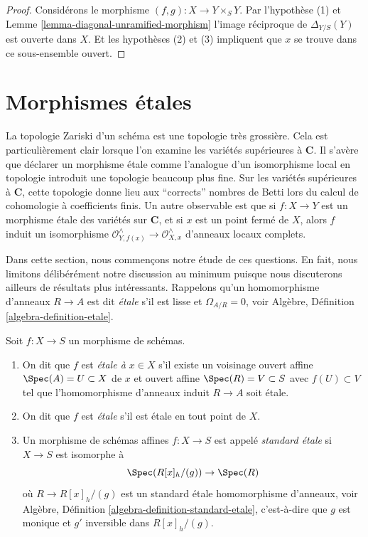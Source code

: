 \begin{proof}
Considérons le morphisme $(f, g) : X \to Y \times_S Y$. Par l'hypothèse (1) et Lemme \ref{lemma-diagonal-unramified-morphism}
l'image réciproque de $\Delta_{Y/S}(Y)$ est ouverte
dans $X$. Et les hypothèses (2) et (3) impliquent
que $x$ se trouve dans ce sous-ensemble ouvert.
\end{proof}










\section{Morphismes étales}
\label{section-etale}

\noindent
La topologie Zariski d'un schéma est une topologie très grossière.
Cela est particulièrement clair lorsque l'on examine les variétés supérieures
à $\mathbf{C}$. Il s’avère que déclarer un morphisme étale comme l’analogue
d’un isomorphisme local en topologie introduit une topologie beaucoup
plus fine. Sur les variétés supérieures à $\mathbf{C}$, cette topologie donne
lieu aux ``corrects'' nombres de Betti lors du calcul de
cohomologie à coefficients finis. Un autre observable est que si $f : X \to Y$ est un
morphisme étale des variétés sur $\mathbf{C}$, et si
$x$ est un point fermé
de $X$, alors $f$ induit un isomorphisme $\mathcal{O}^{\wedge}_{Y, f(x)} \to \mathcal{O}^{\wedge}_{X, x}$ d'anneaux
locaux complets.

\medskip\noindent Dans
cette section, nous commençons notre étude de ces questions. En fait, nous limitons
délibérément notre discussion au minimum puisque nous discuterons ailleurs de résultats
plus intéressants. Rappelons qu'un homomorphisme d'anneaux $R \to A$ est dit {\it
étale} s'il est lisse
et $\Omega_{A/R} = 0$, voir Algèbre, Définition \ref{algebra-definition-etale}.

\begin{definition}
\label{definition-etale}
Soit $f : X \to S$ un morphisme de schémas.
\begin{enumerate}
\item On dit que $f$ est {\it étale
à $x \in X$} s'il existe un voisinage ouvert affine $\Spec(A) = U \subset X$
de $x$ et ouvert affine $\Spec(R) = V \subset S$ avec $f(U) \subset V$
tel que l'homomorphisme d'anneaux induit $R \to A$
soit étale.
\item On dit que $f$ est {\it étale} s'il est étale en tout point de $X$.
\item Un morphisme de schémas affines $f : X \to S$ est appelé {\it
standard étale} si $X \to S$ est isomorphe à
$$
\Spec(R[x]_h/(g)) \to \Spec(R)
$$
où $R \to R[x]_h/(g)$ est un standard étale homomorphisme d'anneaux,
voir Algèbre, Définition \ref{algebra-definition-standard-etale}, c'est-à-dire que $g$
est monique et $g'$ inversible dans $R[x]_h/(g)$.
\end{enumerate}
\end{definition}

